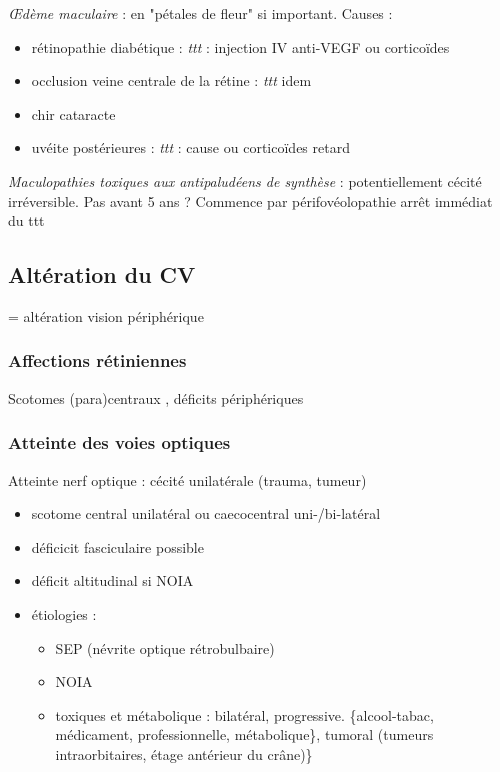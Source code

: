 \documentclass[11pt]{article}
\begin{document}
\emph{\OE{}dème maculaire} : en "pétales de fleur" si important. Causes : 
\begin{itemize}
\item rétinopathie diabétique : \emph{ttt} : injection IV anti-VEGF ou corticoïdes
\item occlusion veine centrale de la rétine : \emph{ttt} idem
\item chir cataracte
\item uvéite postérieures : \emph{ttt} : cause ou corticoïdes retard
\end{itemize}

\emph{Maculopathies toxiques aux antipaludéens de synthèse} : potentiellement cécité
irréversible. Pas avant 5 ans ? Commence par périfovéolopathie \thus arrêt
immédiat du ttt \danger

\subsection{Altération du CV}
\label{sec:orge282bfd}
= altération vision périphérique

\subsubsection{Affections rétiniennes}
\label{sec:org6f4d440}
Scotomes (para)centraux , déficits périphériques

\subsubsection{Atteinte des voies optiques}
\label{sec:org12c2a83}
Atteinte nerf optique : cécité unilatérale (trauma, tumeur) 
\begin{itemize}
\item scotome central unilatéral ou caecocentral uni-/bi-latéral
\item déficicit fasciculaire possible
\item déficit altitudinal si \gls{NOIA}
\item étiologies :
\begin{itemize}
\item SEP (névrite optique rétrobulbaire)
\item NOIA
\item toxiques et métabolique : bilatéral, progressive. \{alcool-tabac, médicament,
professionnelle, métabolique\}, tumoral (tumeurs intraorbitaires, étage
antérieur du crâne)\}
\end{itemize}
\end{itemize}
\end{document}
